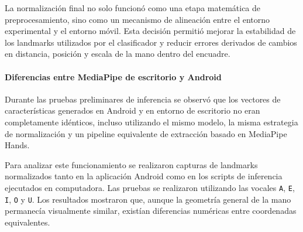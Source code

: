 	La normalización final no solo funcionó como una etapa matemática de preprocesamiento, sino como un mecanismo de alineación entre el entorno experimental y el entorno móvil. Esta decisión permitió mejorar la estabilidad de los landmarks utilizados por el clasificador y reducir errores derivados de cambios en distancia, posición y escala de la mano dentro del encuadre.
	
	\paragraph{Diferencias entre MediaPipe de escritorio y Android}
	
	Durante las pruebas preliminares de inferencia se observó que los vectores de características generados en Android y en entorno de escritorio no eran completamente idénticos, incluso utilizando el mismo modelo, la misma estrategia de normalización y un pipeline equivalente de extracción basado en MediaPipe Hands.
	
	Para analizar este funcionamiento se realizaron capturas de landmarks normalizados tanto en la aplicación Android como en los scripts de inferencia ejecutados en computadora. Las pruebas se realizaron utilizando las vocales \texttt{A}, \texttt{E}, \texttt{I}, \texttt{O} y \texttt{U}. Los resultados mostraron que, aunque la geometría general de la mano permanecía visualmente similar, existían diferencias numéricas entre coordenadas equivalentes.
	
